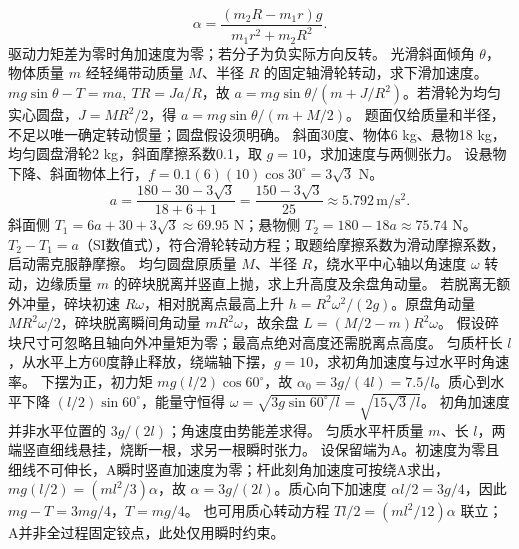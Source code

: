 \[
\alpha=\frac{(m_2R-m_1r)g}{m_1r^2+m_2R^2}.
\]
\crosscheck 驱动力矩差为零时角加速度为零；若分子为负实际方向反转。
\problemtext 光滑斜面倾角 $\theta$，物体质量 $m$ 经轻绳带动质量 $M$、半径 $R$ 的固定轴滑轮转动，求下滑加速度。
\workings $mg\sin\theta-T=ma,\ TR=Ja/R$，故 $a=mg\sin\theta/(m+J/R^2)$。若滑轮为均匀实心圆盘，$J=MR^2/2$，得 $a=mg\sin\theta/(m+M/2)$。
\crosscheck 题面仅给质量和半径，不足以唯一确定转动惯量；圆盘假设须明确。
\problemtext 斜面30度、物体6 kg、悬物18 kg，均匀圆盘滑轮2 kg，斜面摩擦系数0.1，取 $g=10$，求加速度与两侧张力。
\workings 设悬物下降、斜面物体上行，$f=0.1(6)(10)\cos30^\circ=3\sqrt3$ N。
\[
a=\frac{180-30-3\sqrt3}{18+6+1}=\frac{150-3\sqrt3}{25}\approx5.792\,\mathrm{m/s^2}.
\]
斜面侧 $T_1=6a+30+3\sqrt3\approx69.95$ N；悬物侧 $T_2=180-18a\approx75.74$ N。
\crosscheck $T_2-T_1=a$（SI数值式），符合滑轮转动方程；取题给摩擦系数为滑动摩擦系数，启动需克服静摩擦。
\problemtext 均匀圆盘原质量 $M$、半径 $R$，绕水平中心轴以角速度 $\omega$ 转动，边缘质量 $m$ 的碎块脱离并竖直上抛，求上升高度及余盘角动量。
\workings 若脱离无额外冲量，碎块初速 $R\omega$，相对脱离点最高上升 $h=R^2\omega^2/(2g)$。原盘角动量 $MR^2\omega/2$，碎块脱离瞬间角动量 $mR^2\omega$，故余盘 $L=(M/2-m)R^2\omega$。
\crosscheck 假设碎块尺寸可忽略且轴向外冲量矩为零；最高点绝对高度还需脱离点高度。
\problemtext 匀质杆长 $l$，从水平上方60度静止释放，绕端轴下摆，$g=10$，求初角加速度与过水平时角速率。
\workings 下摆为正，初力矩 $mg(l/2)\cos60^\circ$，故 $\alpha_0=3g/(4l)=7.5/l$。质心到水平下降 $(l/2)\sin60^\circ$，能量守恒得 $\omega=\sqrt{3g\sin60^\circ/l}=\sqrt{15\sqrt3/l}$。
\crosscheck 初角加速度并非水平位置的 $3g/(2l)$；角速度由势能差求得。
\problemtext 匀质水平杆质量 $m$、长 $l$，两端竖直细线悬挂，烧断一根，求另一根瞬时张力。
\workings 设保留端为A。初速度为零且细线不可伸长，A瞬时竖直加速度为零；杆此刻角加速度可按绕A求出，$mg(l/2)=(ml^2/3)\alpha$，故 $\alpha=3g/(2l)$。质心向下加速度 $\alpha l/2=3g/4$，因此 $mg-T=3mg/4$，$T=mg/4$。
\crosscheck 也可用质心转动方程 $Tl/2=(ml^2/12)\alpha$ 联立；A并非全过程固定铰点，此处仅用瞬时约束。

